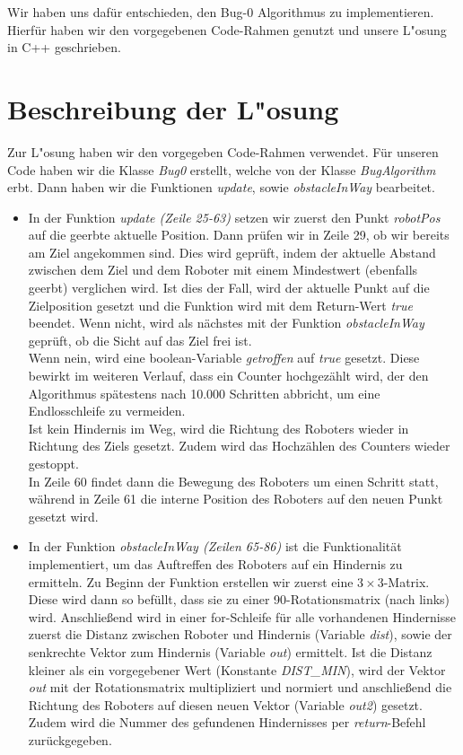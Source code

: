\documentclass[a4paper]{scrartcl}
\begin{document}
Wir haben uns dafür entschieden, den Bug-0 Algorithmus zu implementieren. Hierfür haben wir den vorgegebenen Code-Rahmen genutzt und unsere L"osung in C++ geschrieben.

\section*{Beschreibung der L"osung}

Zur L"osung haben wir den vorgegeben Code-Rahmen verwendet. Für unseren Code haben wir die Klasse \textit{Bug0} erstellt, welche von der Klasse \textit{BugAlgorithm} erbt. Dann haben wir die Funktionen \textit{update}, sowie \textit{obstacleInWay} bearbeitet.\\
\begin{itemize}
\item In der Funktion \textit{update (Zeile 25-63)} setzen wir zuerst den Punkt \textit{robotPos} auf die geerbte aktuelle Position. Dann prüfen wir in Zeile 29, ob wir bereits am Ziel angekommen sind. Dies wird geprüft, indem der aktuelle Abstand zwischen dem Ziel und dem Roboter mit einem Mindestwert (ebenfalls geerbt) verglichen wird. Ist dies der Fall, wird der aktuelle Punkt auf die Zielposition gesetzt und die Funktion wird mit dem Return-Wert \textit{true} beendet. Wenn nicht, wird als nächstes mit der Funktion \textit{obstacleInWay} geprüft, ob die Sicht auf das Ziel frei ist. \\
Wenn nein, wird eine boolean-Variable \textit{getroffen} auf \textit{true} gesetzt. Diese bewirkt im weiteren Verlauf, dass ein Counter hochgezählt wird, der den Algorithmus spätestens nach 10.000 Schritten abbricht, um eine Endlosschleife zu vermeiden. \\
Ist kein Hindernis im Weg, wird die Richtung des Roboters wieder in Richtung des Ziels gesetzt. Zudem wird das Hochzählen des Counters wieder gestoppt.\\

In Zeile 60 findet dann die Bewegung des Roboters um einen Schritt statt, während in Zeile 61 die interne Position des Roboters auf den neuen Punkt gesetzt wird.

\item In der Funktion \textit{obstacleInWay (Zeilen 65-86)} ist die Funktionalität implementiert, um das Auftreffen des Roboters auf ein Hindernis zu ermitteln. Zu Beginn der Funktion erstellen wir zuerst eine $3\times3$-Matrix. Diese wird dann so befüllt, dass sie zu einer 90\textdegree -Rotationsmatrix (nach links) wird. Anschließend wird in einer for-Schleife für alle vorhandenen Hindernisse zuerst die Distanz zwischen Roboter und Hindernis (Variable \textit{dist}), sowie der senkrechte Vektor zum Hindernis (Variable \textit{out}) ermittelt. Ist die Distanz kleiner als ein vorgegebener Wert (Konstante \textit{DIST\_MIN}), wird der Vektor \textit{out} mit der Rotationsmatrix multipliziert und normiert und anschließend die Richtung des Roboters auf diesen neuen Vektor (Variable \textit{out2}) gesetzt. Zudem wird die Nummer des gefundenen Hindernisses per \textit{return}-Befehl zurückgegeben.
\end{itemize}
\end{document}
